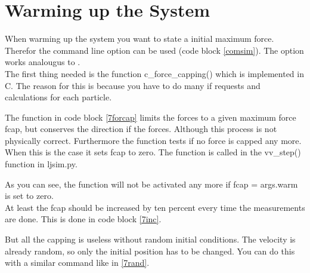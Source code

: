 \section{Warming up the System}

When warming up the system you want to state a initial maximum force.
Therefor the command line option  can be used (code block \ref{comsim}).
The option  works analougus to .\\

The first thing needed is the function c\_force\_capping() which is implemented in C. 
The reason for this is because you have to do many if requests and calculations for each particle.


The function in code block \ref{7forcap} limits the forces to a given maximum force fcap, but conserves the direction if the forces. 
Although this process is not physically correct.
Furthermore the function tests if no force is capped any more. 
When this is the case it sets fcap to zero.
The function is called in the vv\_step() function in ljsim.py.


As you can see, the function will not be activated any more if fcap = args.warm is set to zero.\\

At least the fcap should be increased by ten percent every time the measurements are done. 
This is done in code block \ref{7inc}.


But all the capping is useless without random initial conditions. 
The velocity is already random, so only the initial position has to be changed. 
You can do this with a similar command like in \ref{7rand}.

